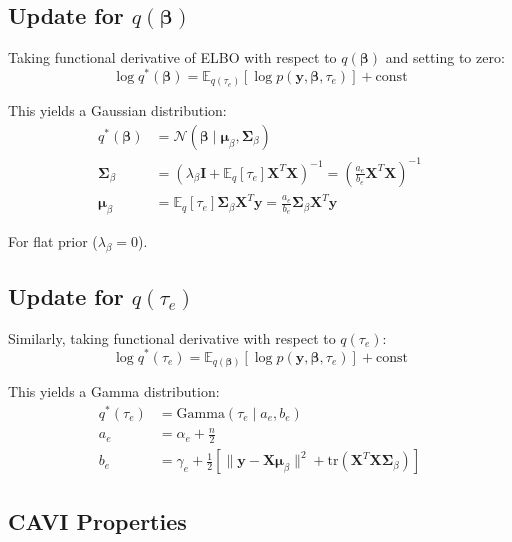 \documentclass[11pt]{article}
\newcommand{\E}{\mathbb{E}}
\newcommand{\N}{\mathcal{N}}
\newcommand{\tr}{\text{tr}}
\begin{document}
\subsection{Update for \texorpdfstring{$q(\bm{\beta})$}{q(beta)}}

Taking functional derivative of ELBO with respect to $q(\bm{\beta})$ and setting to zero:
\begin{equation}
\log q^*(\bm{\beta}) = \E_{q(\tau_e)}[\log p(\bm{y}, \bm{\beta}, \tau_e)] + \text{const}
\end{equation}

This yields a Gaussian distribution:
\begin{align}
q^*(\bm{\beta}) &= \N(\bm{\beta} \mid \bm{\mu}_\beta, \bm{\Sigma}_\beta)\\
\bm{\Sigma}_\beta &= \left(\lambda_\beta \bm{I} + \E_q[\tau_e] \bm{X}^T\bm{X}\right)^{-1} = \left(\frac{a_e}{b_e} \bm{X}^T\bm{X}\right)^{-1} \label{eq:cavi_Sigma}\\
\bm{\mu}_\beta &= \E_q[\tau_e] \bm{\Sigma}_\beta \bm{X}^T\bm{y} = \frac{a_e}{b_e} \bm{\Sigma}_\beta \bm{X}^T\bm{y} \label{eq:cavi_mu}
\end{align}

For flat prior ($\lambda_\beta = 0$).

\subsection{Update for \texorpdfstring{$q(\tau_e)$}{q(tau_e)}}

Similarly, taking functional derivative with respect to $q(\tau_e)$:
\begin{equation}
\log q^*(\tau_e) = \E_{q(\bm{\beta})}[\log p(\bm{y}, \bm{\beta}, \tau_e)] + \text{const}
\end{equation}

This yields a Gamma distribution:
\begin{align}
q^*(\tau_e) &= \text{Gamma}(\tau_e \mid a_e, b_e)\\
a_e &= \alpha_e + \frac{n}{2} \label{eq:cavi_a}\\
b_e &= \gamma_e + \frac{1}{2}\left[\|\bm{y} - \bm{X}\bm{\mu}_\beta\|^2 + \tr(\bm{X}^T\bm{X}\bm{\Sigma}_\beta)\right] \label{eq:cavi_b}
\end{align}

\subsection{CAVI Properties}
\end{document}
